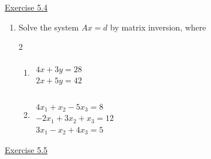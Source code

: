\underline{Exercise 5.4}

\begin{enumerate}

\item[6.] Solve the system $A x=d$ by matrix inversion, where
\vspace{-1.25cm}
\begin{multicols}{2}
\begin{enumerate}
\item [(a)] $\begin{aligned} \\
	4 x+3 y=28 \\
	2 x+5 y=42
\end{aligned}$
\item [(b)] $\begin{aligned} \\~\\
	4 x_{1}+x_{2}-5 x_{3}=8 \\
	-2 x_{1}+3 x_{2}+x_{3}=12 \\
	3 x_{1}-x_{2}+4 x_{3}=5
\end{aligned}$
\end{enumerate}
\end{multicols} 
\end{enumerate}

\underline{Exercise 5.5}

